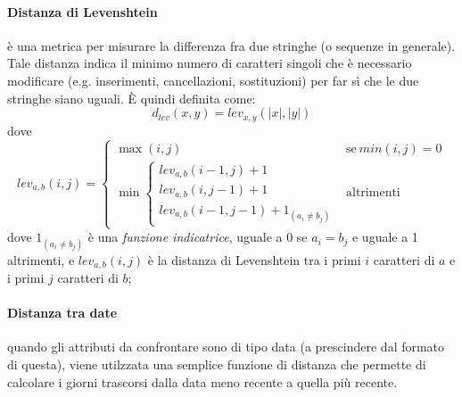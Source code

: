 \paragraph{Distanza di Levenshtein} è una metrica per misurare la differenza fra due stringhe (o sequenze in generale). Tale distanza indica il minimo numero di caratteri singoli che è necessario modificare (e.g. inserimenti, cancellazioni, sostituzioni) per far sì che le due stringhe siano uguali. È quindi definita come:
\begin{equation}
	d_{lev}(x,y) = lev_{x,y}(|x|,|y|)
\end{equation}
dove 
$$lev_{a,b}(i,j) = 
\begin{cases}
	\max(i,j) & \text{se}\ min(i,j) = 0 \\
    \min{ 
    	\begin{cases}
    		lev_{a,b}(i-1,j) + 1 \\
           	lev_{a,b}(i,j-1) + 1 \\
            lev_{a,b}(i-1,j-1) + 1_{(a_i \neq b_j)}
    	\end{cases}} & \text{altrimenti}
\end{cases}
$$
dove $1_{(a_i \neq b_j)}$ è una \textit{funzione indicatrice}, uguale a 0 se $a_i = b_j$ e uguale a 1 altrimenti, e $lev_{a,b}(i,j)$ è la distanza di Levenshtein  tra i primi $i$ caratteri di $a$ e i primi $j$ caratteri di $b$;
\paragraph{Distanza tra date} quando gli attributi da confrontare sono di tipo data (a prescindere dal formato di questa), viene utilzzata una semplice funzione di distanza che permette di calcolare i giorni trascorsi dalla data meno recente a quella più recente. 
